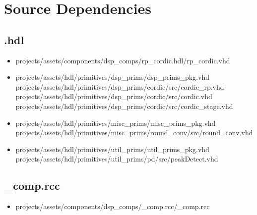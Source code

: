 \newpage

\section*{Source Dependencies}
\subsection*{\comp.hdl}
\begin{itemize}
	\item projects/assets/components/dsp\_comps/rp\_cordic.hdl/rp\_cordic.vhd
	\item projects/assets/hdl/primitives/dsp\_prims/dsp\_prims\_pkg.vhd
	      \subitem projects/assets/hdl/primitives/dsp\_prims/cordic/src/cordic\_rp.vhd
	      \subitem projects/assets/hdl/primitives/dsp\_prims/cordic/src/cordic.vhd
	      \subitem projects/assets/hdl/primitives/dsp\_prims/cordic/src/cordic\_stage.vhd
	\item projects/assets/hdl/primitives/misc\_prims/misc\_prims\_pkg.vhd
	      \subitem projects/assets/hdl/primitives/misc\_prims/round\_conv/src/round\_conv.vhd
	\item projects/assets/hdl/primitives/util\_prims/util\_prims\_pkg.vhd
	      \subitem projects/assets/hdl/primitives/util\_prims/pd/src/peakDetect.vhd
\end{itemize}

\subsection*{\rcc_comp.rcc}
\begin{itemize}
	\item projects/assets/components/dsp\_comps/\rcc_comp.rcc/\rcc_comp.rcc
\end{itemize}

